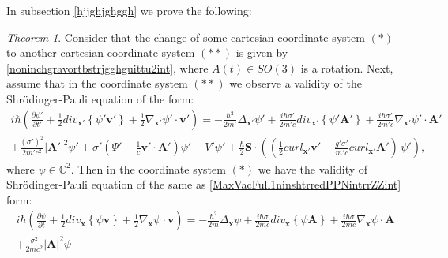 \documentclass{article}
\newtheorem{theorem}{Theorem}[section]
\theoremstyle{definition}
\theoremstyle{remark}
\renewcommand{\vec}[1]{\mathbf{#1}}
\newcommand{\er}{\eqref}
\newcommand{\er}{\eqref}
\newtheorem{theorem}{Theorem}
\begin{document}
In subsection \ref{hjjghjghggh} we prove the following:
\begin{theorem}\label{gjghghgghgintintrrZZint}
Consider that the change of some cartesian coordinate system $(*)$
to another cartesian coordinate system $(**)$ is given by
\er{noninchgravortbstrjgghguittu2int},
where $A(t)\in SO(3)$ is a rotation. Next, assume that in the
coordinate system $(**)$ we observe a validity of the
Shr\"{o}dinger-Pauli equation of the form:
\begin{multline}\label{MaxVacFull1ninshtrredPPNintrrZZint}
i\hbar\left(\frac{\partial\psi'}{\partial t'}+\frac{1}{2}div_{\vec
x'}\left\{\psi'\vec v'\right\}+\frac{1}{2}\nabla_{\vec
x'}\psi'\cdot\vec v'\right)=-\frac{\hbar^2}{2m'}\Delta_{\vec
x'}\psi'+\frac{i\hbar\sigma'}{2m'c}div_{\vec x'}\left\{\psi'\vec
A'\right\}+\frac{i\hbar\sigma'}{2m'c}\nabla_{\vec x'}\psi'\cdot\vec
A'\\+\frac{(\sigma')^2}{2m'c^2}\left|\vec A'\right|^2\psi'
%
%
%
+\sigma'\left(\Psi'-\frac{1}{c}\vec v'\cdot\vec
A'\right)\psi'-V'\psi'+\frac{\hbar}{2}\vec
S\cdot\left(\left(\frac{1}{2}curl_{\vec x'}\vec
v'-\frac{g'\sigma'}{m'c}curl_{\vec x'}\vec A'\right)\,\psi'\right),
\end{multline}
where $\psi\in\mathbb{C}^2$. Then in the coordinate system $(*)$ we
have the validity of Shr\"{o}dinger-Pauli equation of the same as
\er{MaxVacFull1ninshtrredPPNintrrZZint} form:
\begin{multline}\label{MaxVacFull1ninshtrhjkkredPPNintrrZZint}
i\hbar\left(\frac{\partial\psi}{\partial t}+\frac{1}{2}div_{\vec
x}\left\{\psi\vec v\right\}+\frac{1}{2}\nabla_{\vec x}\psi\cdot\vec
v\right)=-\frac{\hbar^2}{2m}\Delta_{\vec
x}\psi+\frac{i\hbar\sigma}{2mc}div_{\vec x}\left\{\psi\vec
A\right\}+\frac{i\hbar\sigma}{2mc}\nabla_{\vec x}\psi\cdot\vec
A\\+\frac{\sigma^2}{2mc^2}\left|\vec A\right|^2\psi

\end{multline}
\end{theorem}
\end{document}
